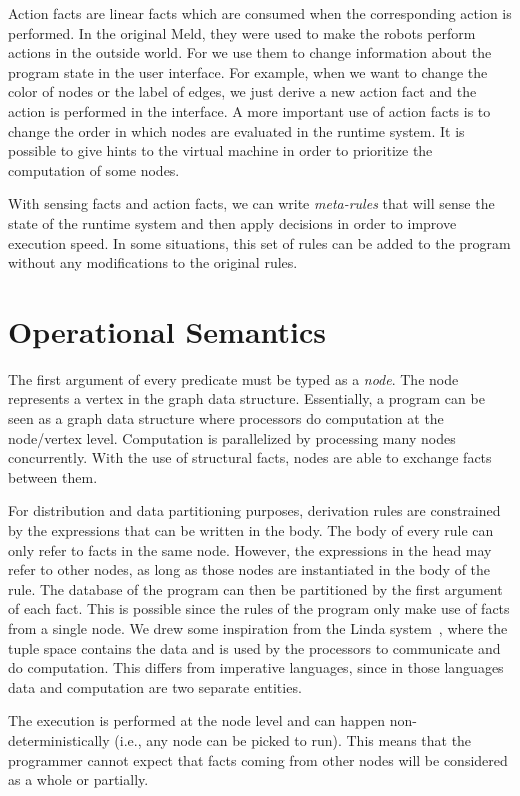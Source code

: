 Action facts are linear facts which are consumed when the corresponding action is performed.
In the original Meld, they were used to make the robots perform actions in the outside world.
For \lang we use them to change information about the program state
in the user interface. For example, when we want to change the color of nodes or the label
of edges, we just derive a new action fact and the action is performed in the interface.
A more important use of action facts is to change the order in which nodes
are evaluated in the runtime system. It is possible to give hints to the virtual
machine in order to prioritize the computation of some nodes.

With sensing facts and action facts, we can write \emph{meta-rules} that will sense the
state of the runtime system and then apply decisions in order to improve execution speed.
In some situations, this set of rules can be added to the program without any modifications
to the original rules.


\section{Operational Semantics}


The first argument of every predicate must be typed as a \emph{node}. The node represents a vertex in the graph data structure.
Essentially, a program can be seen as a graph data structure where processors do computation at the node/vertex level. Computation is
parallelized by processing many nodes concurrently. With the use of structural facts,
nodes are able to exchange facts between them.

For distribution and data partitioning purposes, derivation rules are constrained by the expressions that can be written in the body.
The body of every rule can only refer to facts in the same node.
However, the expressions in the head may refer to other nodes, as long as those nodes are instantiated in the body of the rule.
The database of the program can then be partitioned by the first argument of each fact. This is possible since the rules of the
program only make use of facts from a single node.
We drew some inspiration from the Linda system~\cite{1663305}, where the tuple space contains the data and is used by the processors
to communicate and do computation.
This differs from imperative languages, since in those languages data and computation are two separate entities.

The execution is performed at the node level and can happen non-deterministically (i.e., any node can
be picked to run). This means that the programmer cannot expect
that facts coming from other nodes will be considered as a whole or partially.

